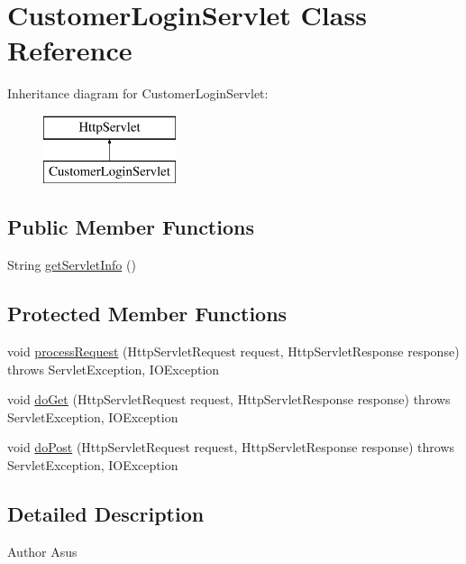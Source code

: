 \hypertarget{class_customer_login_servlet}{}\section{Customer\+Login\+Servlet Class Reference}
\label{class_customer_login_servlet}
Inheritance diagram for Customer\+Login\+Servlet\+:\begin{figure}[H]
\begin{center}
\leavevmode
\includegraphics[height=2.000000cm]{class_customer_login_servlet}
\end{center}
\end{figure}
\subsection*{Public Member Functions}
\begin{DoxyCompactItemize}
\item 
String \mbox{\hyperlink{class_customer_login_servlet_a7f98e5d3efa19e38f1fd188dd56af17c}{get\+Servlet\+Info}} ()
\end{DoxyCompactItemize}
\subsection*{Protected Member Functions}
\begin{DoxyCompactItemize}
\item 
void \mbox{\hyperlink{class_customer_login_servlet_a0f003dcbdbf45a815eb54a01fb430677}{process\+Request}} (Http\+Servlet\+Request request, Http\+Servlet\+Response response)  throws Servlet\+Exception, I\+O\+Exception 
\item 
void \mbox{\hyperlink{class_customer_login_servlet_ae6d67d2b4148532307f544248e8075d3}{do\+Get}} (Http\+Servlet\+Request request, Http\+Servlet\+Response response)  throws Servlet\+Exception, I\+O\+Exception 
\item 
void \mbox{\hyperlink{class_customer_login_servlet_ae51d29b131844b7c997754bf3effd262}{do\+Post}} (Http\+Servlet\+Request request, Http\+Servlet\+Response response)  throws Servlet\+Exception, I\+O\+Exception 
\end{DoxyCompactItemize}


\subsection{Detailed Description}
\begin{DoxyAuthor}{Author}
Asus 
\end{DoxyAuthor}



